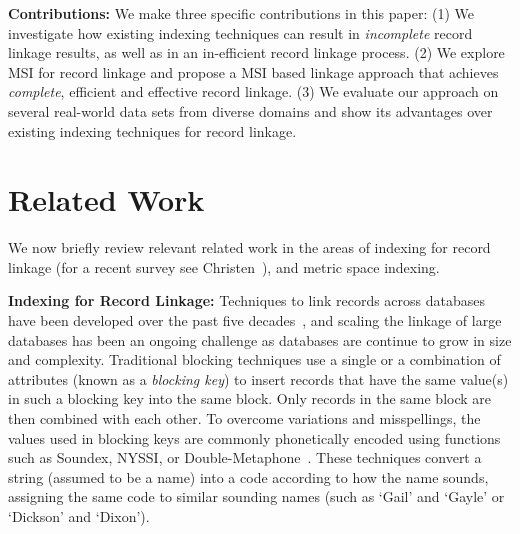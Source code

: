 \documentclass{llncs}
\begin{document}
\smallskip
\textbf{Contributions:} We make three specific contributions in this
paper: (1) We investigate how existing indexing techniques can result
in \emph{incomplete} record linkage results, as well as in an
in-efficient record linkage process. (2) We explore MSI for record
linkage and propose a MSI based linkage approach that achieves
\emph{complete}, efficient and effective record linkage. (3) We
evaluate our approach on several real-world data sets from diverse
domains and show its advantages over existing indexing techniques for
record linkage.




%


\section{Related Work}
\label{sec-related}

We now briefly review relevant related work in the areas of indexing
for record linkage (for a recent survey see Christen~\cite{Chr12b}),
and metric space indexing. 

\smallskip
\textbf{Indexing for Record Linkage:}
Techniques to link records across databases have been developed over
the past five decades~\cite{Fel69}, and scaling the linkage of large
databases has been an ongoing challenge as databases are continue to
grow in size and complexity. Traditional blocking techniques use a
single or a combination of attributes (known as a \emph{blocking key})
to insert records that have the same value(s) in such a blocking key
into the same block. Only records in the same block are then combined
with each other. To overcome variations and misspellings, the values
used in blocking keys are commonly phonetically encoded using functions
such as Soundex, NYSSI, or Double-Metaphone~\cite{Chr12}. These
techniques convert a string (assumed to be a name) into a code
according to how the name sounds, assigning the same code to similar
sounding names (such as `Gail' and `Gayle' or `Dickson' and `Dixon').
\end{document}
